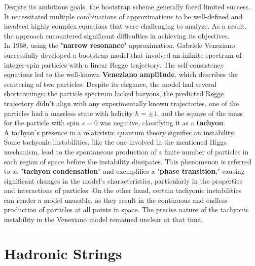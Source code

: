 \documentclass[12pt]{article}
\begin{document}
Despite its ambitious goals, the bootstrap scheme generally faced limited success. It necessitated multiple combinations of approximations to be well-defined and involved highly complex equations that were challenging to analyze. As a result, the approach encountered significant difficulties in achieving its objectives.
\\
In 1968, using the "\textbf{narrow resonance}" approximation, Gabriele Veneziano successfully developed a bootstrap model that involved an infinite spectrum of integer-spin particles with a linear Regge trajectory. The self-consistency equations led to the well-known \textbf{Veneziano amplitude}, which describes the scattering of two particles. Despite its elegance, the model had several shortcomings: the particle spectrum lacked baryons, the predicted Regge trajectory didn't align with any experimentally known trajectories, one of the particles had a massless state with helicity $h = \pm 1$, and the square of the mass for the particle with spin $s=0$ was negative, classifying it as a \textbf{tachyon}.\\



A tachyon's presence in a relativistic quantum theory signifies an instability. Some tachyonic instabilities, like the one involved in the mentioned Higgs mechanism, lead to the spontaneous production of a finite number of particles in each region of space before the instability dissipates. This phenomenon is referred to as "\textbf{tachyon condensation}" and exemplifies a "\textbf{phase transition}," causing significant changes in the model's characteristics, particularly in the properties and interactions of particles. On the other hand, certain tachyonic instabilities can render a model unusable, as they result in the continuous and endless production of particles at all points in space. The precise nature of the tachyonic instability in the Veneziano model remained unclear at that time.

\section{Hadronic Strings}
\end{document}
